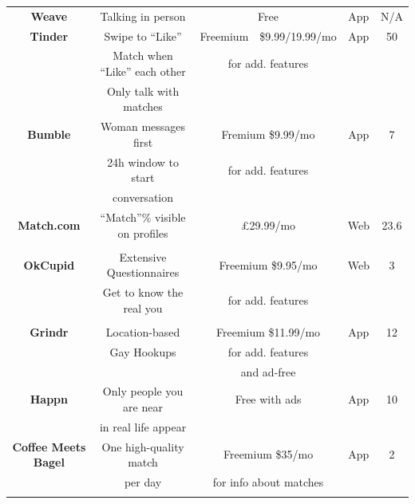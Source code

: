 \documentclass[12pt, a4paper]{article}
\let\cite\shortcite
\newcounter{TableFootnoteStart}
\newenvironment{autothreeparttable}{\begin{threeparttable}\setcounter{TableFootnoteStart}{\thefootnote}}{\end{threeparttable}}
\newcommand{\autonote}{\stepcounter{footnote}\tnote{\thefootnote}~~}
\newenvironment{main}
{\begin{spacing}{1.2}\setlength{\parskip}{0.5\baselineskip}}
{\end{spacing}\setlength{\parskip}{0pt}}
\begin{document}
\begin{main}
\begin{appendices}
\begin{table}
\begin{center}
{\begin{autothreeparttable}
\begin{tabular}{ccccc}
						\textbf{Weave}\label{competitor:Weave} & Talking in person & Free & App & N/A\\
						
						\rowcolor{lgrey}\textbf{Tinder}\label{competitor:Tinder} & Swipe to ``Like'' & Freemium\autonote \$9.99/19.99/mo & App & 50 \\
						\rowcolor{lgrey} \cite{Tinder} & Match when ``Like'' each other & for add. features & & \cite{TinderUsers} \\
						\rowcolor{lgrey} & Only talk with matches & \cite{TinderPrice} & & \\
						
						\textbf{Bumble}\label{competitor:Bumble} & Woman messages first & Fremium \$9.99/mo & App & 7 \\
						\cite{Bumble} & 24h window to start & for add. features & & \cite{BumbleUsers} \\
						& conversation & \cite{BumblePrice} & & \\
						
						\rowcolor{lgrey}\textbf{Match.com}\label{competitor:Match} & ``Match''\% visible on profiles & \pounds 29.99/mo & Web & 23.6 \\
						\rowcolor{lgrey}\cite{Match} & & \cite{MatchPrices} & &  \cite{MatchUsers} \\
						
						\textbf{OkCupid}\label{competitor:OkCupid} & Extensive Questionnaires & Freemium \$9.95/mo & Web & 3 \\
						\cite{OkCupid} & Get to know the real you & for add. features & & \cite{OkCupidUsers} \\
						& & \cite{OkCupidPrice} & \\
						
						\rowcolor{lgrey}\textbf{Grindr}\label{competitor:Grindr} & Location-based & Freemium \$11.99/mo & App & 12 \\
						\rowcolor{lgrey}\cite{Grindr} & Gay Hookups & for add. features & & \cite{GrindrUsers} \\
						\rowcolor{lgrey} & & and ad-free \cite{GrindrPrice} & & \\
						
						\textbf{Happn}\label{competitor:Happn} & Only people you are near & Free with ads & App & 10 \\
						\cite{Happn} & in real life appear & \cite{HappnPrice} & & \cite{HappnUsers} \\
						
						\rowcolor{lgrey}\textbf{Coffee Meets Bagel}\label{competitor:CoffeeMeetsBagel} & One high-quality match & Freemium \$35/mo & App & 2 \\
						\rowcolor{lgrey}\cite{CoffeeMeetsBagel} & per day & for info about matches & & \cite{CoffeeMeetsBagelUsers} \\
						\rowcolor{lgrey} & & \cite{CoffeeMeetsBagelPrice} & & \\
						

\end{tabular}
\end{autothreeparttable}}
\end{center}
\end{table}
\end{appendices}
\end{main}
\end{document}
